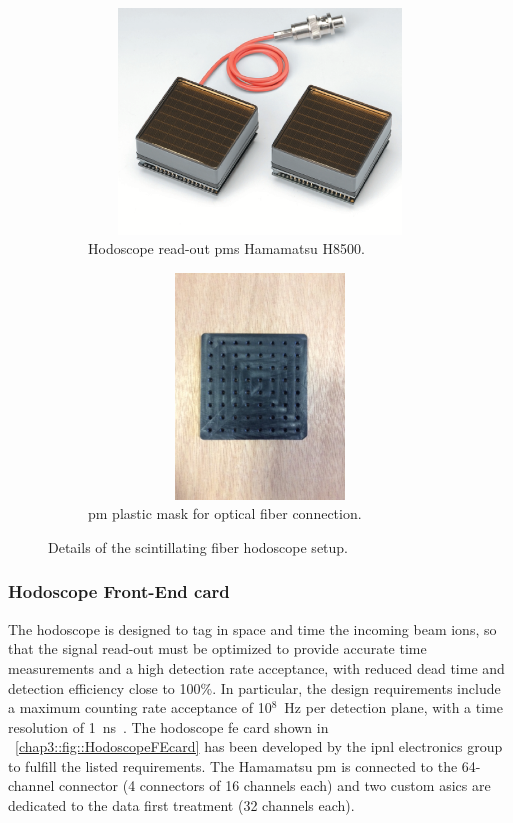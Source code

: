 \begin{figure}
\newline
\begin{subfigure}[t]{0.5\textwidth}
\centering
\includegraphics[width=1\textwidth, height = 6cm]{03_GraphicFiles/chapter3_CLaRySproto/Hodoscope/H8500.png}
\caption{Hodoscope read-out \glspl{pm} Hamamatsu H8500.}
\label{chap3::fig::PMH8500}
\end{subfigure}
\begin{subfigure}[t]{.5\textwidth}
\centering
\includegraphics[width=1\textwidth, trim = {0 3cm 0 5cm}, clip = true, height = 6cm]{03_GraphicFiles/chapter3_CLaRySproto/Hodoscope/Hodoscope_PMmask.JPG}
\caption{\gls{pm} plastic mask for optical fiber connection.}
\label{chap3::fig::PMmask}
\end{subfigure}
\caption{Details of the scintillating fiber hodoscope setup.}
\label{chap3::fig::HodoscopeParts}
\end{figure}


\subsubsection{Hodoscope Front-End card}\label{chap3::subsubsec::HodoFEcard}

The hodoscope is designed to tag in space and time the incoming beam ions, so that the signal read-out must be optimized to provide accurate time measurements and a high detection rate acceptance, with reduced dead time and detection efficiency close to 100\%. In particular, the design requirements include a maximum counting rate acceptance of 10$^{8}$~Hz per detection plane, with a time resolution of 1~ns~\parencite{Krimmer2014}.  The hodoscope \gls{fe} card shown in \figurename~\ref{chap3::fig::HodoscopeFEcard} has been developed by the \gls{ipnl} electronics group to fulfill the listed requirements. The Hamamatsu \gls{pm} is connected to the 64-channel connector (4 connectors of 16 channels each) and two custom \glspl{asic} are dedicated to the data first treatment (32 channels each).

